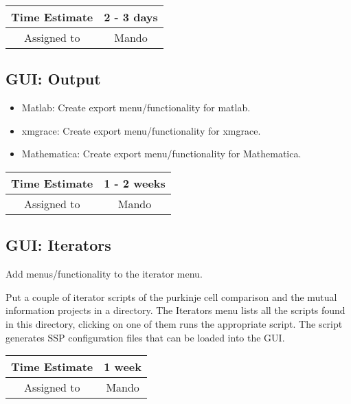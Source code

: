 \documentclass[12pt]{article}
\begin{document}
\begin{center}
  \vspace{5mm}
  \centering
  \begin{tabular}{|c|c|}
    \hline
    Time Estimate
    & 2 - 3 days \\
    \hline
    Assigned to
    & Mando \\
    \hline
  \end{tabular}
\end{center}


\subsection{GUI: Output}
\begin{itemize}
\item Matlab: Create export menu/functionality for matlab.
\item xmgrace: Create export menu/functionality for xmgrace.
\item Mathematica: Create export menu/functionality for Mathematica.
\end{itemize}

\begin{center}
  \vspace{5mm}
  \centering
  \begin{tabular}{|c|c|}
    \hline
    Time Estimate
    & 1 - 2 weeks \\
    \hline
    Assigned to
    & Mando \\
    \hline
  \end{tabular}
\end{center}


\subsection{GUI: Iterators}
Add menus/functionality to the iterator menu.

Put a couple of iterator scripts of the purkinje cell comparison and
the mutual information projects in a directory.  The Iterators menu
lists all the scripts found in this directory, clicking on one of them
runs the appropriate script.  The script generates SSP configuration
files that can be loaded into the GUI.

\begin{center}
  \vspace{5mm}
  \centering
  \begin{tabular}{|c|c|}
    \hline
    Time Estimate
    & 1 week \\
    \hline
    Assigned to
    & Mando \\
    \hline
  \end{tabular}
\end{center}
\end{document}
